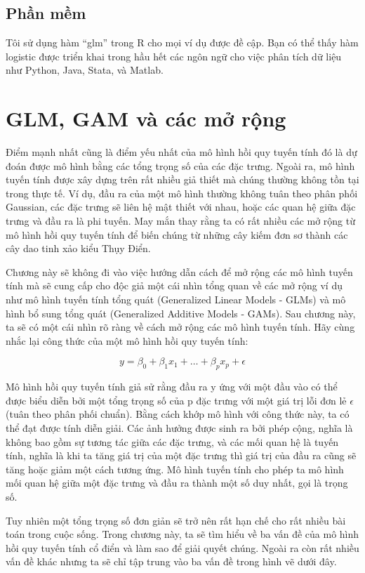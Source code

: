 \subsection{Phần mềm}
Tôi sử dụng hàm ``glm'' trong R cho mọi ví dụ được đề cập. Bạn có thể thấy hàm logistic được triển khai trong hầu hết các ngôn ngữ cho việc phân tích dữ liệu như Python, Java, Stata, và Matlab.

\section{GLM, GAM và các mở rộng}
Điểm mạnh nhất cũng là điểm yếu nhất của mô hình hồi quy tuyến tính đó là dự đoán được mô hình bằng các tổng trọng số của các đặc trưng. Ngoài ra, mô hình tuyến tính được xây dựng trên rất nhiều giả thiết mà chúng thường không tồn tại trong thực tế. Ví dụ, đầu ra của một mô hình thường không tuân theo phân phối Gaussian, các đặc trưng sẽ liên hệ mật thiết với nhau, hoặc các quan hệ giữa đặc trưng và đầu ra là phi tuyến. May mắn thay rằng ta có rất nhiều các mở rộng từ mô hình hồi quy tuyến tính để biến chúng từ những cây kiếm đơn sơ thành các cây dao tinh xảo kiểu Thụy Điển.

Chương này sẽ không đi vào việc hướng dẫn cách để mở rộng các mô hình tuyến tính mà sẽ cung cấp cho độc giả một cái nhìn tổng quan về các mở rộng ví dụ như mô hình tuyến tính tổng quát (Generalized Linear Models - GLMs) và mô hình bổ sung tổng quát (Generalized Additive Models - GAMs). Sau chương này, ta sẽ có một cái nhìn rõ ràng về cách mở rộng các mô hình tuyến tính. 
Hãy cùng nhắc lại công thức của một mô hình hồi quy tuyến tính:

$$y=\beta_{0}+\beta_{1}x_{1}+\ldots+\beta_{p}x_{p}+\epsilon$$

Mô hình hồi quy tuyến tính giả sử rằng đầu ra y ứng với một đầu vào có thể được biểu diễn bởi một tổng trọng số của p đặc trưng với một giá trị lỗi đơn lẻ $\epsilon$ (tuân theo phân phối chuẩn). Bằng cách khớp mô hình với công thức này, ta có thể đạt được tính diễn giải. Các ảnh hưởng được sinh ra bởi phép cộng, nghĩa là không bao gồm sự tương tác giữa các đặc trưng, và các mối quan hệ là tuyến tính, nghĩa là khi ta tăng giá trị của một đặc trưng thì giá trị của đầu ra cũng sẽ tăng hoặc giảm một cách tương ứng. Mô hình tuyến tính cho phép ta mô hình mối quan hệ giữa một đặc trưng và đầu ra thành một số duy nhất, gọi là trọng số.

Tuy nhiên một tổng trọng số đơn giản sẽ trở nên rất hạn chế cho rất nhiều bài toán trong cuộc sống. Trong chương này, ta sẽ tìm hiểu về ba vấn đề của mô hình hồi quy tuyến tính cổ điển và làm sao để giải quyết chúng. Ngoài ra còn rất nhiều vấn đề khác nhưng ta sẽ chỉ tập trung vào ba vấn đề trong hình vẽ dưới đây.

